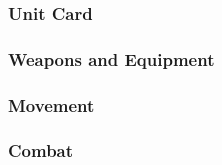 

\subsubsection*{Unit Card}



\subsubsection*{Weapons and Equipment}



\subsubsection*{Movement}



\subsubsection*{Combat}


